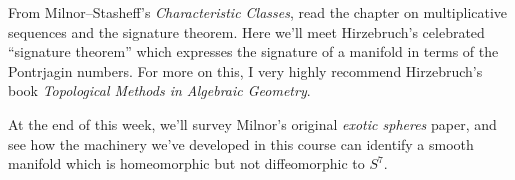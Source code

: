 \documentclass{homework}
\author{Jim Fowler}
\date{Week 15: Multiplicative sequences}
\begin{document}
\maketitle

From Milnor--Stasheff's \textit{Characteristic Classes}, read the
chapter on multiplicative sequences and the signature theorem.  Here
we'll meet Hirzebruch's celebrated ``signature theorem'' which
expresses the signature of a manifold in terms of the Pontrjagin
numbers.  For more on this, I very highly recommend Hirzebruch's book
\textit{Topological Methods in Algebraic Geometry}.

At the end of this week, we'll survey Milnor's original \textit{exotic
  spheres} paper, and see how the machinery we've developed in this
course can identify a smooth manifold which is homeomorphic but not
diffeomorphic to $S^7$.
\end{document}
